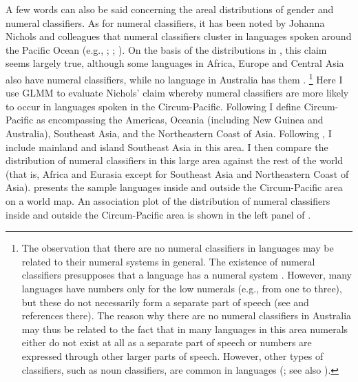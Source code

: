 \documentclass[output=collectionpaper]{langsci/langscibook}
\begin{document}
A few words can also be said concerning the areal distributions of gender and numeral classifiers. As for numeral classifiers, it has been noted by Johanna Nichols and colleagues that numeral classifiers cluster in languages spoken around the Pacific Ocean (e.g., \citealt[132--133]{Nichols1992}; \citealt[366--367]{Nichols1996}; \citealt[299]{Nichols2003}). On the basis of the distributions in , this claim seems largely true, although some languages in Africa, Europe and Central Asia also have numeral classifiers, while no language in Australia has them \citep[121--124]{Aikhenvald2000}.%
\footnote{The observation that there are no numeral classifiers in  languages may be related to their numeral systems in general. The existence of numeral classifiers presupposes that a language has a numeral system \citep[99]{Aikhenvald2000}. However, many  languages have numbers only for the low numerals (e.g., from one to three), but these do not necessarily form a separate part of speech (see \citealt[100]{Aikhenvald2000} and references there). The reason why there are no numeral classifiers in Australia may thus be related to the fact that in many languages in this area numerals either do not exist at all as a separate part of speech or numbers are expressed through other larger parts of speech. However, other types of classifiers, such as noun classifiers, are common in  languages (\citealt[82]{Aikhenvald2000}; see also \citealt{Plaster2007}).} %
Here I use GLMM to evaluate Nichols' claim whereby numeral classifiers are more likely to occur in languages spoken in the Circum-Pacific. Following \citet{Bickel2006} I define Circum-Pacific as encompassing the Americas, Oceania (including New Guinea and Australia), Southeast Asia, and the Northeastern Coast of Asia. Following \citet{Nichols2003}, I include mainland and island Southeast Asia in this area. I then compare the distribution of numeral classifiers in this large area against the rest of the world (that is, Africa and Eurasia except for Southeast Asia and Northeastern Coast of Asia).  presents the sample languages inside and outside the Circum-Pacific area on a world map. An association plot of the distribution of numeral classifiers inside and outside the Circum-Pacific area is shown in the left panel of .
\end{document}
